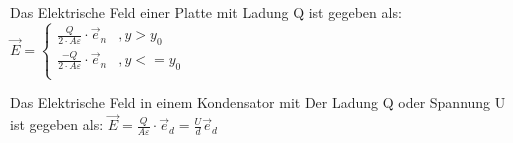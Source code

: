 					\beginbsp
					Das Elektrische Feld einer Platte mit Ladung Q ist gegeben als:
					\formulaBegin
						$\vec{E} = \begin{cases}
      \frac{Q}{2\cdot A \varepsilon} \cdot \vec{e}_n & , y > y_0 \\
			\frac{-Q}{2\cdot A \varepsilon} \cdot \vec{e}_n & , y <= y_0 \\

	 \end{cases}
$
					\formulaEnd
					\begin{center}
					\end{center}
					\iend



					\beginbsp
					Das Elektrische Feld in einem Kondensator mit Der Ladung Q oder Spannung U ist gegeben als:
					\formulaBegin
						$\vec{E} = \frac{Q}{A\varepsilon} \cdot \vec{e}_d = \frac{U}{d	} \vec{e}_d$
					\formulaEnd
					\begin{center}
					\end{center}
					\iend



